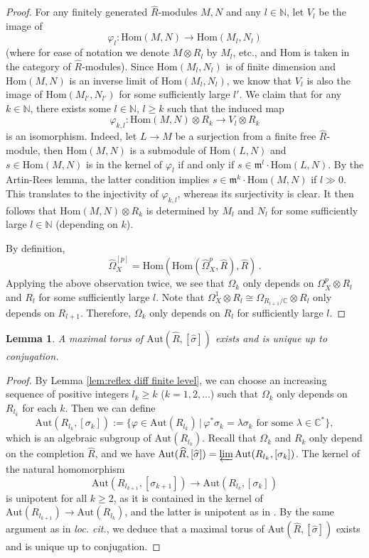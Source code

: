 \documentclass[12pt]{amsart}
\newtheorem{lem}[prop]{Lemma}
\theoremstyle{definition}
\newcommand{\bC}{\mathbb{C}}
\newcommand{\bN}{\mathbb{N}}
\newcommand{\fm}{\mathfrak{m}}
\newcommand{\Hom}{\mathrm{Hom}}
\newcommand{\Aut}{\mathrm{Aut}}
\numberwithin{equation}{section}
\begin{document}
\begin{proof}
For any finitely generated $\widehat{R}$-modules $M,N$ and any $l\in \bN$, let $V_l$ be the image of $$\varphi_l\colon \Hom(M,N)\to \Hom(M_l,N_l)$$ (where for ease of notation we denote $M\otimes R_l$ by $M_l$, etc., and Hom is taken in the category of $\widehat{R}$-modules). Since $\Hom(M_l,N_l)$ is of finite dimension and $\Hom(M,N)$ is an inverse limit of $\Hom(M_l,N_l)$, we know that $V_l$ is also the image of $\Hom(M_{l'},N_{l'})$ for some sufficiently large $l'$. We claim that for any $k\in\bN$, there exists some $l\in\bN$, $l\ge k$ such that the induced map 
\[
\varphi_{k,l}\colon\Hom(M,N)\otimes R_k \to V_l\otimes R_k
\]
is an isomorphism. Indeed, let $L\to M$ be a surjection from a finite free $\widehat{R}$-module, then $\Hom(M,N)$ is a submodule of $\Hom(L,N)$ and $s\in \Hom(M,N)$ is in the kernel of $\varphi_{l}$ if and only if $s\in \fm^l \cdot\Hom(L,N)$. By the Artin-Rees lemma, the latter condition implies $s\in \fm^k\cdot\Hom(M,N)$ if $l\gg 0$. This translates to the injectivity of $\varphi_{k,l}$, whereas its surjectivity is clear. It then follows that $\Hom(M,N)\otimes R_k$ is determined by $M_l$ and $N_l$ for some sufficiently large $l\in\bN$ (depending on $k$).

By definition, $$\widehat{\Omega}_{X}^{[p]} = \Hom(\Hom(\widehat{\Omega}_{X}^p,\widehat{R}),\widehat{R})\,.$$ Applying the above observation twice, we see that $\Omega_k$ only depends on $\Omega_{X}^p\otimes R_l$ and $R_l$ for some sufficiently large $l$. Note that $\Omega_{X}^1\otimes R_l\cong \Omega_{R_{l+1}/\bC}\otimes R_l$ only depends on $R_{l+1}$. Therefore, $\Omega_k$ only depends on $R_l$ for sufficiently large $l$.
\end{proof}

\begin{lem} \label{lem:max torus in formal auto}
A maximal torus of $\Aut(\widehat{R},[\widehat{\sigma}])$ exists and is unique up to conjugation. 
\end{lem}

\begin{proof}
By Lemma \ref{lem:reflex diff finite level}, we can choose an increasing sequence of positive integers $l_k\ge k$ ($k=1,2,\dots$) such that $\Omega_k$ only depends on $R_{l_k}$ for each $k$. Then we can define
\[
\Aut(R_{l_k},[\sigma_k]) := \{\varphi\in \Aut(R_{l_k})\,|\,\varphi^*\sigma_k = \lambda \sigma_k \mbox{ for some } \lambda\in \bC^*\},
\]
which is an algebraic subgroup of $\Aut(R_{l_k})$. Recall that $\Omega_k$ and $R_k$ only depend on the completion $\widehat{R}$, and we have $\Aut(\widehat{R},[\widehat{\sigma}]) = \varprojlim \Aut(R_{l_k},[\sigma_k]) $. The kernel of the natural homomorphism
\[
\Aut(R_{l_{k+1}},[\sigma_{k+1}])\to \Aut(R_{l_k},[\sigma_k])
\]
is unipotent for all $k\ge 2$, as it is contained in the kernel of $\Aut(R_{l_{k+1}})\to \Aut(R_{l_k})$, and the latter is unipotent as in \cite[8.4]{Kol-cone-auto}. By the same argument as in {\it loc. cit.}, we deduce that a maximal torus of $\Aut(\widehat{R},[\widehat{\sigma}])$ exists and is unique up to conjugation. 
\end{proof}
\end{document}
